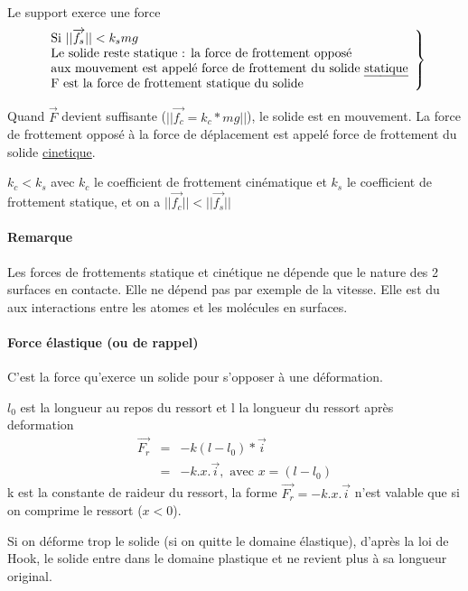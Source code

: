 Le support exerce une force \[
	\left.
	\begin{array}{l}
		\text{Si } ||\overrightarrow{f_s}|| < k_smg\\
	\text{Le solide reste statique : la force de frottement opposé} \\
	\text{aux mouvement est appelé force de frottement du solide \ul{statique}}\\
	\text{F est la force de frottement statique du solide}
	\end{array}
	\right\}
\]

Quand $\vec{F}$ devient suffisante ($||\overrightarrow{f_c} = k_c*mg||$), le solide est en mouvement. La force de frottement opposé à la force de déplacement est appelé force de frottement du solide \ul{cinetique}.

$k_c < k_s$ avec $k_c$ le coefficient de frottement cinématique et $k_s$ le coefficient de frottement statique, et on a $||\overrightarrow{f_c}|| < ||\overrightarrow{f_s}||$
\paragraph{Remarque} Les forces de frottements statique et cinétique ne dépende que le nature des 2 surfaces en contacte. Elle ne dépend pas par exemple de la vitesse.
Elle est du aux interactions entre les atomes et les molécules en surfaces.

\newpage

\paragraph{Force élastique (ou de rappel)} C'est la force qu'exerce un solide pour s'opposer à une déformation.

\begin{wrapfigure}{r}{0pt}
\end{wrapfigure}
$l_0$ est la longueur au repos du ressort et l la longueur du ressort après deformation
\begin{align*}
	\overrightarrow{F_r} &=& -k(l-l_0)*\vec{i} \\
										&=& -k.x.\vec{i}, \text{ avec }x=(l-l_0)
\end{align*}
k est la constante de raideur du ressort, la forme $\vec{F_r} = -k.x.\vec{i}$ n'est valable que si on comprime le ressort ($x<0$).

Si on déforme trop le solide (si on quitte le domaine élastique), d'après la loi de Hook, le solide entre dans le domaine plastique et ne revient plus à sa longueur original.
